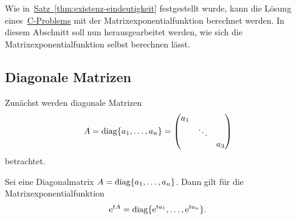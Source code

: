 Wie in~\hyperref[thm:existenz-eindeutigkeit]{Satz~\ref*{thm:existenz-eindeutigkeit}} festgestellt wurde,
kann die Lösung eines~\hyperref[eq:cp]{C-Problems} mit der Matrixexponentialfunktion berechnet werden.
In diesem Abschnitt soll nun herausgearbeitet werden, wie sich die Matrixexponentialfunktion selbst berechnen lässt.

\subsection{Diagonale Matrizen}\label{subsec:diagonale-matrizen}
Zunächst werden diagonale Matrizen
\begin{equation*}
    A = \operatorname{diag}\{a_1,\dots,a_n\}
    = \begin{pmatrix}
          a_1 &        & \\
              & \ddots & \\
              &        & a_3
    \end{pmatrix}
\end{equation*}
betrachtet.

\begin{theorem}\label{thm:matrixexponential-diagonal}
    Sei eine Diagonalmatrix $A = \operatorname{diag}\{a_1,\dots,a_n\}$.
    Dann gilt für die Matrixexponentialfunktion
    \begin{equation*}
        \mathrm{e}^{t A} = \operatorname{diag}\{\mathrm{e}^{t a_1},\dots,\mathrm{e}^{t a_n}\}.
    \end{equation*}
\end{theorem}

